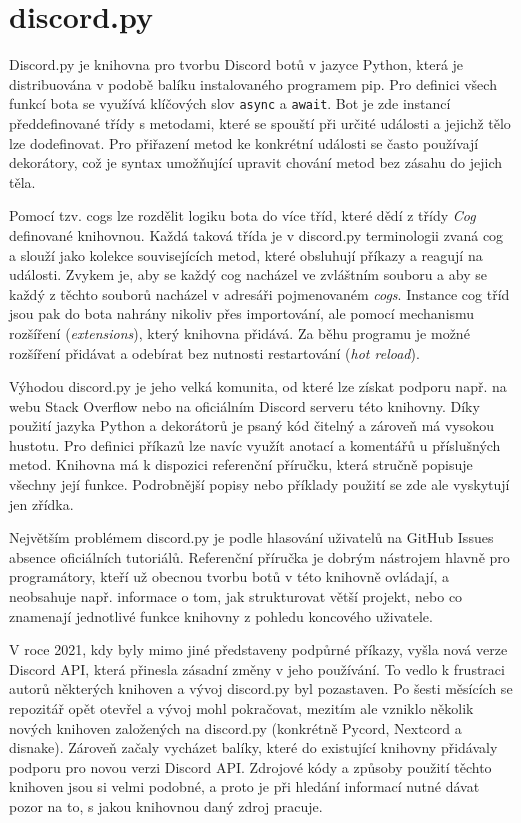 \documentclass[FM]{tulthesis}
\begin{document}
	\section{discord.py}\label{_tag_section_discordpy}
	
	Discord.py je knihovna pro tvorbu Discord botů v jazyce Python, která je distribuována v podobě balíku instalovaného programem pip. Pro definici všech funkcí bota se využívá klíčových slov \verb|async| a \verb|await|. Bot je zde instancí předdefinované třídy s metodami, které se spouští při určité události a jejichž tělo lze dodefinovat. Pro přiřazení metod ke konkrétní události se často používají dekorátory, což je syntax umožňující upravit chování metod bez zásahu do jejich těla.
	
	Pomocí tzv. cogs lze rozdělit logiku bota do více tříd, které dědí z třídy \textit{Cog} definované knihovnou. Každá taková třída je v discord.py terminologii zvaná cog a slouží jako kolekce souvisejících metod, které obsluhují příkazy a reagují na události. Zvykem je, aby se každý cog nacházel ve zvláštním souboru a aby se každý z těchto souborů nacházel v adresáři pojmenovaném \textit{cogs}. Instance cog tříd jsou pak do bota nahrány nikoliv přes importování, ale pomocí mechanismu rozšíření \mbox{(\textit{extensions})}, který knihovna přidává. Za běhu programu je možné rozšíření přidávat a odebírat bez nutnosti restartování (\textit{hot reload}).
	
	Výhodou discord.py je jeho velká komunita, od které lze získat podporu např. na webu Stack Overflow nebo na oficiálním Discord serveru této knihovny. Díky použití jazyka Python a dekorátorů je psaný kód čitelný a zároveň má vysokou hustotu. Pro definici příkazů lze navíc využít anotací a komentářů u příslušných metod. Knihovna má k dispozici referenční příručku, která stručně popisuje všechny její funkce. Podrobnější popisy nebo příklady použití se zde ale vyskytují jen zřídka.
	
	Největším problémem discord.py je podle hlasování uživatelů na GitHub \mbox{Issues} absence oficiálních tutoriálů. Referenční příručka je dobrým nástrojem hlavně pro programátory, kteří už obecnou tvorbu botů v této knihovně ovládají, a neobsahuje např. informace o tom, jak strukturovat větší projekt, nebo co znamenají jednotlivé funkce knihovny z pohledu koncového uživatele.
	
	V roce 2021, kdy byly mimo jiné představeny podpůrné příkazy, vyšla nová verze Discord API, která přinesla zásadní změny v jeho používání. To vedlo k frustraci autorů některých knihoven a vývoj discord.py byl pozastaven. Po šesti měsících se repozitář opět otevřel a vývoj mohl pokračovat, mezitím ale vzniklo několik nových knihoven založených na discord.py (konkrétně Pycord, Nextcord a disnake). Zároveň začaly vycházet balíky, které do existující knihovny přidávaly podporu pro novou verzi Discord API. Zdrojové kódy a způsoby použití těchto knihoven jsou si velmi podobné, a proto je při hledání informací nutné dávat pozor na to, s jakou knihovnou daný zdroj pracuje.
	
\end{document}
